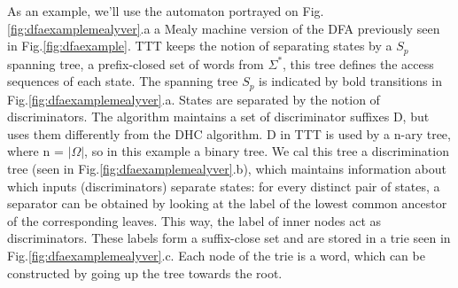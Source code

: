 \begin{example}
	As an example, we'll use the automaton portrayed on Fig.\ref{fig:dfaexamplemealyver}.a a Mealy machine version of the DFA previously seen in Fig.\ref{fig:dfaexample}. TTT keeps the notion of separating states by a $S_p$ spanning tree, a prefix-closed set of words from $\Sigma^*$, this tree defines the access sequences of each state. The spanning tree $S_p$ is indicated by bold transitions in Fig.\ref{fig:dfaexamplemealyver}.a. States are separated by the notion of discriminators. The algorithm maintains a set of discriminator suffixes D, but uses them differently from the DHC algorithm. D in TTT is used by a n-ary tree, where n = $|\Omega|$, so in this example a binary tree. We cal this tree a discrimination tree (seen in Fig.\ref{fig:dfaexamplemealyver}.b), which maintains information about which inputs (discriminators) separate states: for every distinct pair of states, a separator can be obtained by looking at the label of the lowest common ancestor of the corresponding leaves. This way, the label of inner nodes act as discriminators. These labels form a suffix-close set and are stored in a trie seen in Fig.\ref{fig:dfaexamplemealyver}.c. Each node of the trie is a word, which can be constructed by going up the tree towards the root.
\end{example}

